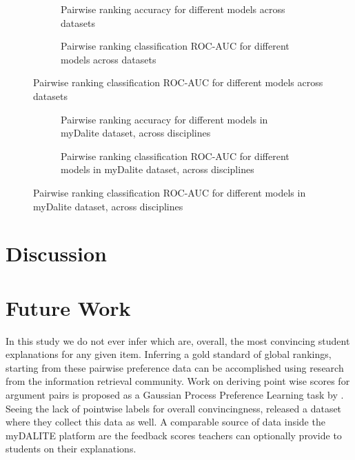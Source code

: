 \documentclass[runningheads]{llncs}
\begin{document}
\begin{figure}
	\begin{subfigure}[t]{0.5\linewidth}
		\centering
		\scalebox{0.4}{}

		\caption{Pairwise ranking accuracy for different models across datasets}
	\end{subfigure}%
	\hfill
	\begin{subfigure}[t]{0.5\linewidth}
		\centering
		\scalebox{0.4}{}

		\caption{Pairwise ranking classification ROC-AUC for different models 
		across datasets}
	\end{subfigure}
\end{figure}


\begin{figure}
	\begin{subfigure}[t]{0.5\linewidth}
		\centering
		\scalebox{0.4}{}
		
		\caption{Pairwise ranking accuracy for different models in myDalite 
		dataset, across disciplines}
	\end{subfigure}%
	\hfill
	\begin{subfigure}[t]{0.5\linewidth}
		\centering
		\scalebox{0.4}{}
		
		\caption{Pairwise ranking classification ROC-AUC for different models 
		in myDalite dataset, across disciplines}
	\end{subfigure}
\end{figure}


\section{Discussion}

\section{Future Work}
In this study we do not ever infer which are, overall, the most convincing 
student explanations for any given item. Inferring a gold standard of global 
rankings, starting from these pairwise preference data can be accomplished 
using research from the information retrieval 
community\cite{chen_pairwise_2013}. Work on deriving point wise scores for 
argument pairs is proposed as a Gaussian Process Preference Learning task by 
\cite{simpson_finding_2018}. Seeing the lack of pointwise labels for overall 
convincingness, \cite{toledo_automatic_2019} released a dataset where they 
collect this data as well. A comparable source of data inside the myDALITE 
platform are the feedback scores teachers can optionally provide to students on 
their explanations.


 
 
\end{document}
